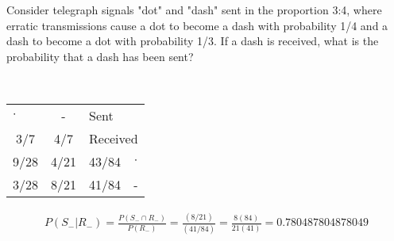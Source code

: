 \documentclass[answers]{exam}
\begin{document}
\begin{questions}
\question 
Consider telegraph signals "dot" and "dash" sent in the proportion 3:4, where erratic transmissions cause a dot to become a dash with probability 1/4 and a dash to become a dot with probability 1/3. If a dash is received, what is the probability that a dash has been sent?
\begin{solution} \\
	\begin{tabular}{cc|cc}
		\multicolumn{1}{l}{$\cdot$} & -    & \multicolumn{1}{l}{Sent} & \multicolumn{1}{l}{} \\
		3/7                         & 4/7  & \multicolumn{2}{r}{Received}                    \\ \hline
		9/28                        & 4/21 & 43/84                    & $\cdot$              \\
		3/28                        & 8/21 & 41/84                    & -                   
	\end{tabular}
	\begin{align*}
		P(S_-|R_-)
		= \frac{P(S_-\cap R_-)}{P(R_-)}
		= \frac{(8/21)}{(41/84)}
		= \frac{8(84)}{21(41)}
		= 0.780487804878049
	\end{align*}
\end{solution}

\clearpage


\end{questions}
\end{document}
